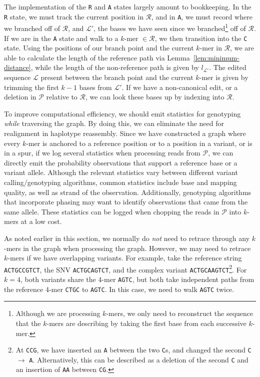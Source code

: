 \documentclass[11pt]{article}
\begin{document}
The implementation of the \texttt{R} and \texttt{A} states largely amount to bookkeeping. In the \texttt{R}
state, we must track the current position in $\mathcal{R}$, and in \texttt{A}, we must record where we
branched off of $\mathcal{R}$, and $\mathcal{L}'$, the bases we have seen since we
branched\footnote{Although we are processing $k$-mers, we only need to reconstruct the sequence that
the $k$-mers are describing by taking the first base from each successive $k$-mer.} off of $\mathcal{R}$.
If we are in the \texttt{A} state and walk to a $k$-mer $\in \mathcal{R}$, we then transition into the
\texttt{C} state. Using the positions of our branch point and the current $k$-mer in $\mathcal{R}$, we are
able to calculate the length of the reference path via Lemma~\ref{lem:minimum-distance}, while the length
of the non-reference path is given by $l_{\mathcal{L}'}$. The edited sequence $\mathcal{L}$ present
between the branch point and the current $k$-mer is given by trimming the first $k - 1$ bases from
$\mathcal{L}'$. If we have a non-canonical edit, or a deletion in $\mathcal{P}$ relative to $\mathcal{R}$,
we can look these bases up by indexing into $\mathcal{R}$.

To improve computational efficiency, we should emit statistics for genotyping \emph{while} traversing the graph. By doing
this, we can eliminate the need for realignment in haplotype reassembly. Since we have constructed a
graph where every $k$-mer is anchored to a reference position or to a position in a variant, or is in a spur,
if we log several statistics when processing reads from $\mathcal{P}$, we can directly emit the probability
observations that support a reference base or a variant allele. Although the relevant statistics vary
between different variant calling/genotyping algorithms, common statistics include base and mapping
quality, as well as strand of the observation. Additionally, genotyping algorithms that incorporate phasing
may want to identify observations that came from the same allele. These statistics can be logged when
chopping the reads in $\mathcal{P}$ into $k$-mers at a low cost.

As noted earlier in this section, we normally do \emph{not} need to retrace through any $k$-mers in the
graph when processing the graph. However, we may need to retrace $k$-mers if we have overlapping
variants. For example, take the reference string \texttt{ACTGCCGTCT}, the SNV \texttt{ACTGCAGTCT},
and the complex variant \texttt{ACTGCAAGTCT}\footnote{At \texttt{CCG}, we have inserted an \texttt{A}
between the two \texttt{C}s, and changed the second \texttt{C} $\rightarrow$ \texttt{A}. Alternatively, this
can be described as a deletion of the second \texttt{C} and an insertion of \texttt{AA} between
\texttt{CG}.}. For $k = 4$, both variants share the 4-mer \texttt{AGTC}, but both take independent paths
from the reference 4-mer \texttt{CTGC} to \texttt{AGTC}. In this case, we need to walk \texttt{AGTC} twice.
\end{document}
